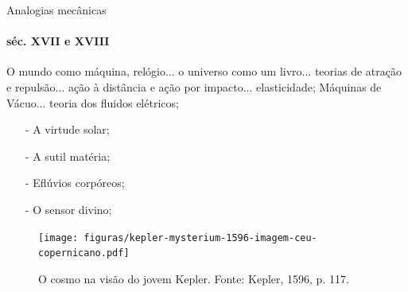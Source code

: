 \documentclass[aspectratio=169]{beamer}
\begin{document}
\begin{frame}{Analogias mecânicas}
\framesubtitle{séc. XVII e XVIII}
\begin{minipage}{0.57\textwidth}
O mundo como máquina, relógio... o universo como um livro... teorias de atração e repulsão... ação à distância e ação por impacto... elasticidade; Máquinas de Vácuo... teoria dos fluidos elétricos;
	\begin{itemize}
		\item[-] A virtude solar;%
		\item[-] A sutil matéria;%
		\item[-] Eflúvios corpóreos;
		\item[-] O sensor divino;
	\end{itemize}
\end{minipage}
\begin{minipage}{0.3\textwidth}
	\begin{figure}
		\centering
		\texttt{[image: figuras/kepler-mysterium-1596-imagem-ceu-copernicano.pdf]}
		\caption{O cosmo na visão do jovem Kepler. Fonte: Kepler, 1596, p. 117.}%
		\label{fig:308} 
	\end{figure} 
\end{minipage}
\end{frame}


\end{document}
